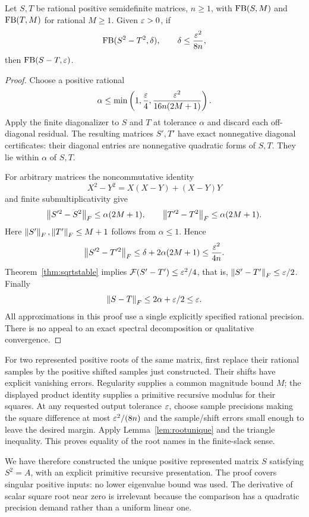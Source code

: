 \begin{lemma}
\label{lem:rootunique}
Let $S,T$ be rational positive semidefinite matrices, $n\ge1$, with
$\operatorname{FB}(S,M)$ and $\operatorname{FB}(T,M)$ for rational $M\ge1$. Given $\varepsilon>0$, if
\[
 \operatorname{FB}(S^2-T^2,\delta),\qquad
 \delta\le\frac{\varepsilon^2}{8n},
\]
then $\operatorname{FB}(S-T,\varepsilon)$.
\end{lemma}
\begin{proof}
Choose a positive rational
\[
 \alpha\le\min\left(1,\frac{\varepsilon}4,
                    \frac{\varepsilon^2}{16n(2M+1)}\right).
\]
Apply the finite diagonalizer to $S$ and $T$ at tolerance $\alpha$ and discard each off-diagonal residual. The resulting matrices $S',T'$ have exact nonnegative diagonal certificates: their diagonal entries are nonnegative quadratic forms of $S,T$. They lie within $\alpha$ of $S,T$.

For arbitrary matrices the noncommutative identity
\[
 X^2-Y^2=X(X-Y)+(X-Y)Y
\]
and finite submultiplicativity give
\[
 \left\lVert S'^2-S^2\right\rVert_F\le\alpha(2M+1),\qquad
 \left\lVert T'^2-T^2\right\rVert_F\le\alpha(2M+1).
\]
Here $\left\lVert S'\right\rVert_F,\left\lVert T'\right\rVert_F\le M+1$ follows from $\alpha\le1$. Hence
\[
 \left\lVert S'^2-T'^2\right\rVert_F\le\delta+2\alpha(2M+1)
 \le\frac{\varepsilon^2}{4n}.
\]
Theorem~\ref{thm:sqrtstable} implies
$\mathcal F(S'-T')\le\varepsilon^2/4$, that is, $\left\lVert S'-T'\right\rVert_F\le\varepsilon/2$.
Finally
\[
 \left\lVert S-T\right\rVert_F\le2\alpha+\varepsilon/2\le\varepsilon.
\]
All approximations in this proof use a single explicitly specified rational precision. There is no appeal to an exact spectral decomposition or qualitative convergence.
\end{proof}

For two represented positive roots of the same matrix, first replace their rational samples by the positive shifted samples just constructed. Their shifts have explicit vanishing errors. Regularity supplies a common magnitude bound $M$; the displayed product identity supplies a primitive recursive modulus for their squares. At any requested output tolerance $\varepsilon$, choose sample precisions making the square difference at most $\varepsilon^2/(8n)$ and the sample/shift errors small enough to leave the desired margin. Apply Lemma~\ref{lem:rootunique} and the triangle inequality. This proves equality of the root names in the finite-slack sense.

We have therefore constructed the unique positive represented matrix $S$ satisfying $S^2=A$, with an explicit primitive recursive presentation. The proof covers singular positive inputs: no lower eigenvalue bound was used. The derivative of scalar square root near zero is irrelevant because the comparison has a quadratic precision demand rather than a uniform linear one.
